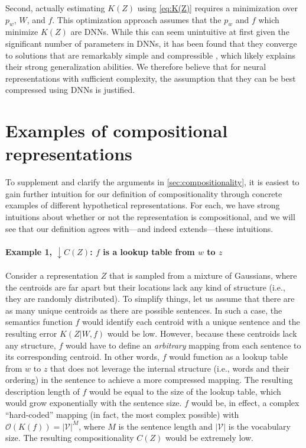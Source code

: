 \documentclass{article} %
\begin{document}
\begin{appendices}
Second, actually estimating $K(Z)$ using \cref{eq:K(Z)} requires a minimization over $p_w$, $W$, and $f$. This optimization approach assumes that the $p_w$ and $f$ which minimize $K(Z)$ are DNNs. While this can seem unintuitive at first given the significant number of parameters in DNNs, it has been found that they converge to solutions that are remarkably simple and compressible \citep{blier2018description,goldblum2023no,sutskever2023observation,rae2023compression}, which likely explains their strong generalization abilities. We therefore believe that for neural representations with sufficient complexity, the assumption that they can be best compressed using DNNs is justified.

\section{Examples of compositional representations}
\label{sec:C(Z)_examples}

To supplement and clarify the arguments in \cref{sec:compositionality}, it is easiest to gain further intuition for our definition of compositionality through concrete examples of different hypothetical representations. For each, we have strong intuitions about whether or not the representation is compositional, and we will see that our definition agrees with---and indeed extends---these intuitions.

\paragraph{Example 1, $\downarrow C(Z)$: $f$ is a lookup table from $w$ to $z$}

Consider a representation $Z$ that is sampled from a mixture of Gaussians, where the centroids are far apart but their locations lack any kind of structure (i.e., they are randomly distributed). To simplify things, let us assume that there are as many unique centroids as there are possible sentences. In such a case, the semantics function $f$ would identify each centroid with a unique sentence and the resulting error $K(Z|W,f)$ would be low. However, because these centroids lack any structure, $f$ would have to define an \emph{arbitrary} mapping from each sentence to its corresponding centroid. In other words, $f$ would function as a lookup table from $w$ to $z$ that does not leverage the internal structure (i.e., words and their ordering) in the sentence to achieve a more compressed mapping. The resulting description length of $f$ would be equal to the size of the lookup table, which would grow exponentially with the sentence size. $f$ would be, in effect, a complex ``hard-coded'' mapping (in fact, the most complex possible) with $\mathcal{O}(K(f)) = |\mathcal{V}|^M$, where $M$ is the sentence length and $|\mathcal{V}|$ is the vocabulary size. The resulting compositionality $C(Z)$ would be extremely low.


\end{appendices}
\end{document}
